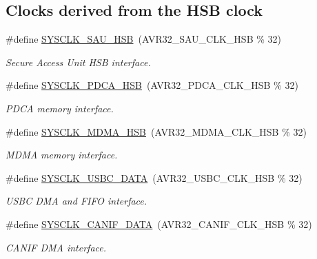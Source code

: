 \subsection*{\-Clocks derived from the \-H\-S\-B clock}
\begin{DoxyCompactItemize}
\item 
\#define \hyperlink{group__sysclk__group_ga86f02a49fa416cb9618274517c7b6a1b}{\-S\-Y\-S\-C\-L\-K\-\_\-\-S\-A\-U\-\_\-\-H\-S\-B}~(\-A\-V\-R32\-\_\-\-S\-A\-U\-\_\-\-C\-L\-K\-\_\-\-H\-S\-B \% 32)
\begin{DoxyCompactList}\small\item\em \-Secure \-Access \-Unit \-H\-S\-B interface. \end{DoxyCompactList}\item 
\#define \hyperlink{group__sysclk__group_ga31a0491a42ddf97870b3218d66921f55}{\-S\-Y\-S\-C\-L\-K\-\_\-\-P\-D\-C\-A\-\_\-\-H\-S\-B}~(\-A\-V\-R32\-\_\-\-P\-D\-C\-A\-\_\-\-C\-L\-K\-\_\-\-H\-S\-B \% 32)
\begin{DoxyCompactList}\small\item\em \-P\-D\-C\-A memory interface. \end{DoxyCompactList}\item 
\#define \hyperlink{group__sysclk__group_gaeb124548e5e161dfa5f3675721da8a82}{\-S\-Y\-S\-C\-L\-K\-\_\-\-M\-D\-M\-A\-\_\-\-H\-S\-B}~(\-A\-V\-R32\-\_\-\-M\-D\-M\-A\-\_\-\-C\-L\-K\-\_\-\-H\-S\-B \% 32)
\begin{DoxyCompactList}\small\item\em \-M\-D\-M\-A memory interface. \end{DoxyCompactList}\item 
\#define \hyperlink{group__sysclk__group_ga8853a36d0721737ccf4f7dfa2287c729}{\-S\-Y\-S\-C\-L\-K\-\_\-\-U\-S\-B\-C\-\_\-\-D\-A\-T\-A}~(\-A\-V\-R32\-\_\-\-U\-S\-B\-C\-\_\-\-C\-L\-K\-\_\-\-H\-S\-B \% 32)
\begin{DoxyCompactList}\small\item\em \-U\-S\-B\-C \-D\-M\-A and \-F\-I\-F\-O interface. \end{DoxyCompactList}\item 
\#define \hyperlink{group__sysclk__group_ga72bf629f809d2df6ef9877b25712ba76}{\-S\-Y\-S\-C\-L\-K\-\_\-\-C\-A\-N\-I\-F\-\_\-\-D\-A\-T\-A}~(\-A\-V\-R32\-\_\-\-C\-A\-N\-I\-F\-\_\-\-C\-L\-K\-\_\-\-H\-S\-B \% 32)
\begin{DoxyCompactList}\small\item\em \-C\-A\-N\-I\-F \-D\-M\-A interface. \end{DoxyCompactList}\item 

\end{DoxyCompactItemize}
